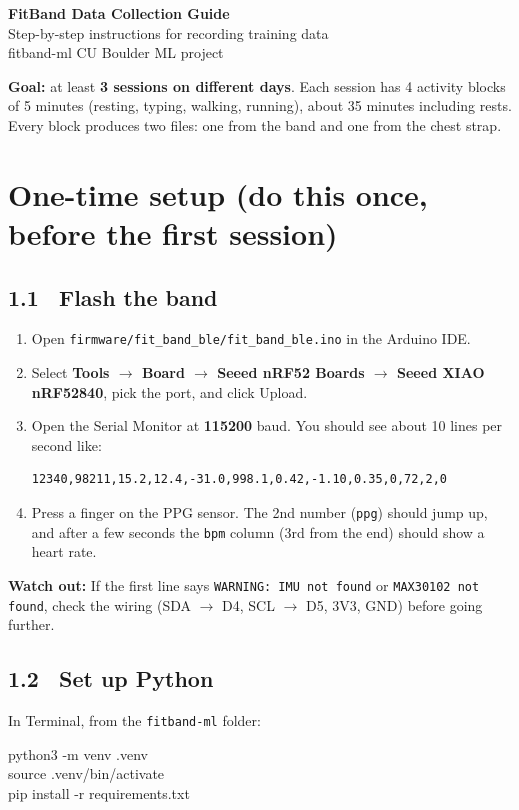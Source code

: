 \documentclass[11pt]{article}
\newcommand{\cmd}[1]{\par\smallskip\colorbox{black!6}{\parbox{\dimexpr\linewidth-2\fboxsep}{\ttfamily\small #1}}\par\smallskip}
\newcommand{\warn}[1]{\par{\color{warn}\textbf{Watch out:} #1}\par}
\begin{document}
{\LARGE\bfseries FitBand Data Collection Guide}\\[4pt]
{\large Step-by-step instructions for recording training data}\\[2pt]
{\small fitband-ml \textbullet{} CU Boulder ML project}

\medskip
\textbf{Goal:} at least \textbf{3 sessions on different days}. Each session has 4 activity blocks of 5 minutes
(resting, typing, walking, running), about 35 minutes including rests. Every block produces two files: one from
the band and one from the chest strap.

\section{One-time setup (do this once, before the first session)}

\subsection*{1.1 \ Flash the band}
\begin{enumerate}[label=\arabic*.]
  \item Open \texttt{firmware/fit\_band\_ble/fit\_band\_ble.ino} in the Arduino IDE.
  \item Select \textbf{Tools $\to$ Board $\to$ Seeed nRF52 Boards $\to$ Seeed XIAO nRF52840}, pick the port, and click Upload.
  \item Open the Serial Monitor at \textbf{115200} baud. You should see about 10 lines per second like:
  \begin{Verbatim}[fontsize=\small, frame=single]
12340,98211,15.2,12.4,-31.0,998.1,0.42,-1.10,0.35,0,72,2,0
  \end{Verbatim}
  \item Press a finger on the PPG sensor. The 2nd number (\texttt{ppg}) should jump up, and after a few
        seconds the \texttt{bpm} column (3rd from the end) should show a heart rate.
\end{enumerate}
\warn{If the first line says \texttt{WARNING: IMU not found} or \texttt{MAX30102 not found}, check the wiring
(SDA $\to$ D4, SCL $\to$ D5, 3V3, GND) before going further.}

\subsection*{1.2 \ Set up Python}
In Terminal, from the \texttt{fitband-ml} folder:
\cmd{python3 -m venv .venv\\source .venv/bin/activate\\pip install -r requirements.txt}
\end{document}
